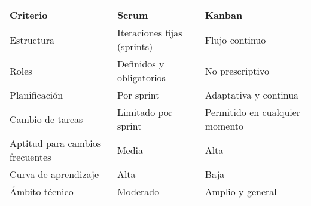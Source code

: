 \begin{longtable}{|p{4cm}|p{4.5cm}|p{4.5cm}|}
\hline
\textbf{Criterio} & \textbf{Scrum} & \textbf{Kanban} \\
\hline
Estructura & Iteraciones fijas (sprints) & Flujo continuo \\
\hline
Roles & Definidos y obligatorios & No prescriptivo \\
\hline
Planificación & Por sprint & Adaptativa y continua \\
\hline
Cambio de tareas & Limitado por sprint & Permitido en cualquier momento \\
\hline
Aptitud para cambios frecuentes & Media & Alta \\
\hline
Curva de aprendizaje & Alta & Baja \\
\hline
Ámbito técnico & Moderado & Amplio y general \\
\hline
\end{longtable}

